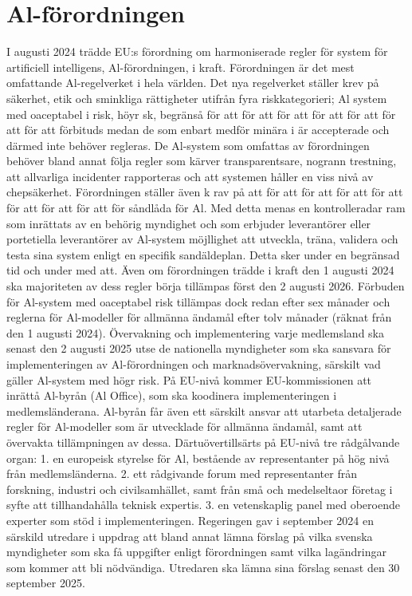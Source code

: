 {{{{{{{{\section*{Al-förordningen}
I augusti 2024 trädde EU:s förordning om harmoniserade regler för system för artificiell intelligens, Al-förordningen, i kraft. Förordningen är det mest omfattande Al-regelverket i hela världen. Det nya regelverket ställer krev på säkerhet, etik och sminkliga rättigheter utifrån fyra riskkategorieri; Al system med oaceptabel i risk, höyr sk, begränså för att för att för att för att för att för att för att förbituds medan de som enbart medför minära i är accepterade och därmed inte behöver regleras.
De Al-system som omfattas av förordningen behöver bland annat följa regler som kärver transparentsare, nogrann trestning, att allvarliga incidenter rapporteras och att systemen håller en viss nivå av chepsäkerhet. Förordningen ställer även k rav på att för att för att för att för att för att för att för att för såndlåda för Al. Med detta menas en kontrolleradar ram som inrättats av en behörig myndighet och som erbjuder leverantörer eller portetiella leverantörer av Al-system möjllighet att utveckla, träna, validera och testa sina system enligt en specifik sandäldeplan. Detta sker under en begränsad tid och under med att.
Även om förordningen trädde i kraft den 1 augusti 2024 ska majoriteten av dess regler börja tillämpas först den 2 augusti 2026. Förbuden för Al-system med oaceptabel risk tillämpas dock redan efter sex månader och reglerna för Al-modeller för allmänna ändamål efter tolv månader (räknat från den 1 augusti 2024).
Övervakning och implementering
varje medlemsland ska senast den 2 augusti 2025 utse de nationella myndigheter som ska sansvara för implementeringen av Al-förordningen och marknadsövervakning, särskilt vad gäller Al-system med högr risk. På EU-nivå kommer EU-kommissionen att inrättå Al-byrån (Al Office), som ska koodinera implementeringen i medlemsländerana. Al-byrån får även ett särskilt ansvar att utarbeta detaljerade regler för Al-modeller som är utvecklade för allmänna ändamål, samt att övervakta tillämpningen av dessa. Därtuövertillsärts på EU-nivå tre rådgålvande organ:
1. en europeisk styrelse för Al, bestående av representanter på hög nivå från medlemsländerna.
2. ett rådgivande forum med representanter från forskning, industri och civilsamhället, samt från små och medelseltaor företag i syfte att tillhandahålla teknisk expertis.
3. en vetenskaplig panel med oberoende experter som stöd i implementeringen.
Regeringen gav i september 2024 en särskild utredare i uppdrag att bland annat lämna förslag på vilka svenska myndigheter som ska få uppgifter enligt förordningen samt vilka lagändringar som kommer att bli nödvändiga. Utredaren ska lämna sina förslag senast den 30 september 2025.

}}}}}}}}
